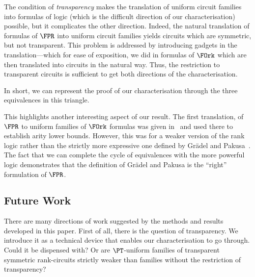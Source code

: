 \documentclass[a4paper,UKenglish]{lipics-v2018}
\begin{document}
The condition of \emph{transparency} makes the translation of uniform circuit families
into formulas of logic (which is the difficult direction of our
characterisation) possible, but it complicates the other direction. Indeed, the
natural translation of formulas of $\FPR$ into uniform circuit families yields
circuits which are symmetric, but not transparent. This problem is addressed by
introducing gadgets in the translation---which for ease of exposition, we did in
formulas of $\FOrk$ which are then translated into circuits in the natural way.
Thus, the restriction to transparent circuits is sufficient to get both
directions of the characterisation. 

In short, we can represent the proof of our characterisation through the three
equivalences in this triangle.

\begin{center}
\end{center}

This highlights another interesting aspect of our result. The first translation,
of $\FPR$ to uniform families of $\FOrk$ formulas was given
in~\cite{Dawar09logicswith} and used there to establish arity lower bounds.
However, this was for a weaker version of the rank logic rather than the
strictly more expressive one defined by Gr\"{a}del and Pakusa~\cite{GradelP15a}.
The fact that we can complete the cycle of equivalences with the more powerful
logic demonstrates that the definition of Gr\"{a}del and Pakusa is the ``right''
formulation of $\FPR$.

\subsection*{Future Work}
There are many directions of work suggested by the methods and results developed
in this paper. First of all, there is the question of transparency. We introduce
it as a technical device that enables our characterisation to go through. Could
it be dispensed with? Or are $\PT$-uniform families of transparent symmetric
rank-circuits strictly weaker than families without the restriction of
transparency? 
\end{document}
